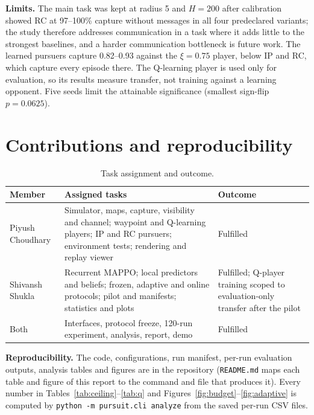 \documentclass{article}
\begin{document}
\textbf{Limits.} The main task was kept at radius 5 and $H=200$ after calibration showed RC at 97--100\% capture without messages in all four predeclared variants; the study therefore addresses communication in a task where it adds little to the strongest baselines, and a harder communication bottleneck is future work. The learned pursuers capture 0.82--0.93 against the $\xi=0.75$ player, below IP and RC, which capture every episode there. The Q-learning player is used only for evaluation, so its results measure transfer, not training against a learning opponent. Five seeds limit the attainable significance (smallest sign-flip $p=0.0625$).

\section{Contributions and reproducibility}
\begin{table}[h]
\centering
\caption{Task assignment and outcome.}
\label{tab:contrib}
\small
\begin{tabular}{p{2.3cm}p{8.2cm}p{2.6cm}}
\toprule
Member & Assigned tasks & Outcome \\
\midrule
Piyush Choudhary & Simulator, maps, capture, visibility and channel; waypoint and Q-learning players; IP and RC pursuers; environment tests; rendering and replay viewer & Fulfilled \\
Shivansh Shukla & Recurrent MAPPO; local predictors and beliefs; frozen, adaptive and online protocols; pilot and manifests; statistics and plots & Fulfilled; Q-player training scoped to evaluation-only transfer after the pilot \\
Both & Interfaces, protocol freeze, 120-run experiment, analysis, report, demo & Fulfilled \\
\bottomrule
\end{tabular}
\end{table}

\textbf{Reproducibility.} The code, configurations, run manifest, per-run evaluation outputs, analysis tables and figures are in the repository (\texttt{README.md} maps each table and figure of this report to the command and file that produces it). Every number in Tables~\ref{tab:ceiling}--\ref{tab:q} and Figures~\ref{fig:budget}--\ref{fig:adaptive} is computed by \texttt{python -m pursuit.cli analyze} from the saved per-run CSV files.



\end{document}
